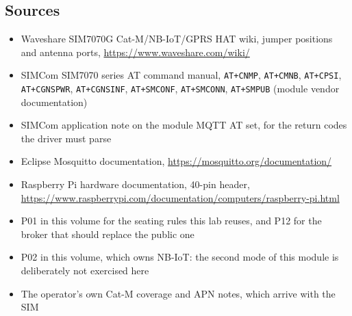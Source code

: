 \subsection*{Sources}

\begin{itemize}
\item Waveshare SIM7070G Cat-M/NB-IoT/GPRS HAT wiki, jumper positions and antenna ports, \url{https://www.waveshare.com/wiki/}
\item SIMCom SIM7070 series AT command manual, \texttt{AT+CNMP}, \texttt{AT+CMNB}, \texttt{AT+CPSI}, \texttt{AT+CGNSPWR}, \texttt{AT+CGNSINF}, \texttt{AT+SMCONF}, \texttt{AT+SMCONN}, \texttt{AT+SMPUB} (module vendor documentation)
\item SIMCom application note on the module MQTT AT set, for the return codes the driver must parse
\item Eclipse Mosquitto documentation, \url{https://mosquitto.org/documentation/}
\item Raspberry Pi hardware documentation, 40-pin header, \url{https://www.raspberrypi.com/documentation/computers/raspberry-pi.html}
\item P01 in this volume for the seating rules this lab reuses, and P12 for the broker that should replace the public one
\item P02 in this volume, which owns NB-IoT: the second mode of this module is deliberately not exercised here
\item The operator's own Cat-M coverage and APN notes, which arrive with the SIM
\end{itemize}
